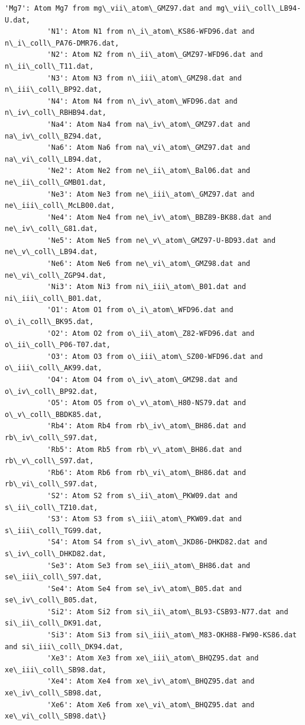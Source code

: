 \documentclass{report}
\begin{document}
\begin{Verbatim}[commandchars=\\\{\}]
          'Mg7': Atom Mg7 from mg\_vii\_atom\_GMZ97.dat and mg\_vii\_coll\_LB94-U.dat,
          'N1': Atom N1 from n\_i\_atom\_KS86-WFD96.dat and n\_i\_coll\_PA76-DMR76.dat,
          'N2': Atom N2 from n\_ii\_atom\_GMZ97-WFD96.dat and n\_ii\_coll\_T11.dat,
          'N3': Atom N3 from n\_iii\_atom\_GMZ98.dat and n\_iii\_coll\_BP92.dat,
          'N4': Atom N4 from n\_iv\_atom\_WFD96.dat and n\_iv\_coll\_RBHB94.dat,
          'Na4': Atom Na4 from na\_iv\_atom\_GMZ97.dat and na\_iv\_coll\_BZ94.dat,
          'Na6': Atom Na6 from na\_vi\_atom\_GMZ97.dat and na\_vi\_coll\_LB94.dat,
          'Ne2': Atom Ne2 from ne\_ii\_atom\_Bal06.dat and ne\_ii\_coll\_GMB01.dat,
          'Ne3': Atom Ne3 from ne\_iii\_atom\_GMZ97.dat and ne\_iii\_coll\_McLB00.dat,
          'Ne4': Atom Ne4 from ne\_iv\_atom\_BBZ89-BK88.dat and ne\_iv\_coll\_G81.dat,
          'Ne5': Atom Ne5 from ne\_v\_atom\_GMZ97-U-BD93.dat and ne\_v\_coll\_LB94.dat,
          'Ne6': Atom Ne6 from ne\_vi\_atom\_GMZ98.dat and ne\_vi\_coll\_ZGP94.dat,
          'Ni3': Atom Ni3 from ni\_iii\_atom\_B01.dat and ni\_iii\_coll\_B01.dat,
          'O1': Atom O1 from o\_i\_atom\_WFD96.dat and o\_i\_coll\_BK95.dat,
          'O2': Atom O2 from o\_ii\_atom\_Z82-WFD96.dat and o\_ii\_coll\_P06-T07.dat,
          'O3': Atom O3 from o\_iii\_atom\_SZ00-WFD96.dat and o\_iii\_coll\_AK99.dat,
          'O4': Atom O4 from o\_iv\_atom\_GMZ98.dat and o\_iv\_coll\_BP92.dat,
          'O5': Atom O5 from o\_v\_atom\_H80-NS79.dat and o\_v\_coll\_BBDK85.dat,
          'Rb4': Atom Rb4 from rb\_iv\_atom\_BH86.dat and rb\_iv\_coll\_S97.dat,
          'Rb5': Atom Rb5 from rb\_v\_atom\_BH86.dat and rb\_v\_coll\_S97.dat,
          'Rb6': Atom Rb6 from rb\_vi\_atom\_BH86.dat and rb\_vi\_coll\_S97.dat,
          'S2': Atom S2 from s\_ii\_atom\_PKW09.dat and s\_ii\_coll\_TZ10.dat,
          'S3': Atom S3 from s\_iii\_atom\_PKW09.dat and s\_iii\_coll\_TG99.dat,
          'S4': Atom S4 from s\_iv\_atom\_JKD86-DHKD82.dat and s\_iv\_coll\_DHKD82.dat,
          'Se3': Atom Se3 from se\_iii\_atom\_BH86.dat and se\_iii\_coll\_S97.dat,
          'Se4': Atom Se4 from se\_iv\_atom\_B05.dat and se\_iv\_coll\_B05.dat,
          'Si2': Atom Si2 from si\_ii\_atom\_BL93-CSB93-N77.dat and si\_ii\_coll\_DK91.dat,
          'Si3': Atom Si3 from si\_iii\_atom\_M83-OKH88-FW90-KS86.dat and si\_iii\_coll\_DK94.dat,
          'Xe3': Atom Xe3 from xe\_iii\_atom\_BHQZ95.dat and xe\_iii\_coll\_SB98.dat,
          'Xe4': Atom Xe4 from xe\_iv\_atom\_BHQZ95.dat and xe\_iv\_coll\_SB98.dat,
          'Xe6': Atom Xe6 from xe\_vi\_atom\_BHQZ95.dat and xe\_vi\_coll\_SB98.dat\}
\end{Verbatim}
        
\end{document}
